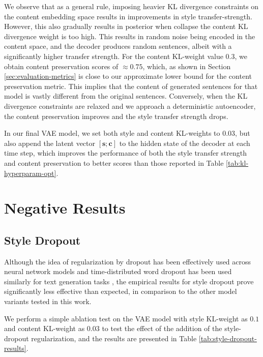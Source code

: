We observe that as a general rule, imposing heavier KL divergence constraints on the content embedding space results in improvements in style transfer-strength. However, this also gradually results in posterior when collapse the content KL divergence weight is too high. This results in random noise being encoded in the content space, and the decoder produces random sentences, albeit with a significantly higher transfer strength. For the content KL-weight value 0.3, we obtain content preservation scores of $\approx 0.75$, which, as shown in Section \ref{sec:evaluation-metrics} is close to our approximate lower bound for the content preservation metric. This implies that the content of generated sentences for that model is vastly different from the original sentences. Conversely, when the KL divergence constraints are relaxed and we approach a deterministic autoencoder, the content preservation improves and the style transfer strength drops.

In our final VAE model, we set both style and content KL-weights to $0.03$, but also append the latent vector $[\bm s; \bm c]$ to the hidden state of the decoder at each time step, which improves the performance of both the style transfer strength and content preservation to better scores than those reported in Table \ref{tab:kl-hyperparam-opt}.


\section{Negative Results}

\subsection{Style Dropout}

Although the idea of regularization by dropout \citep{srivastava2014dropout} has been effectively used across neural network models and time-distributed word dropout has been used similarly for text generation tasks \citep{dai2015semi, bowman2016generating}, the empirical results for style dropout prove significantly less effective than expected, in comparison to the other model variants tested in this work.

We perform a simple ablation test on the VAE model with style KL-weight as $0.1$ and content KL-weight as $0.03$ to test the effect of the addition of the style-dropout regularization, and the results are presented in Table \ref{tab:style-dropout-results}.

